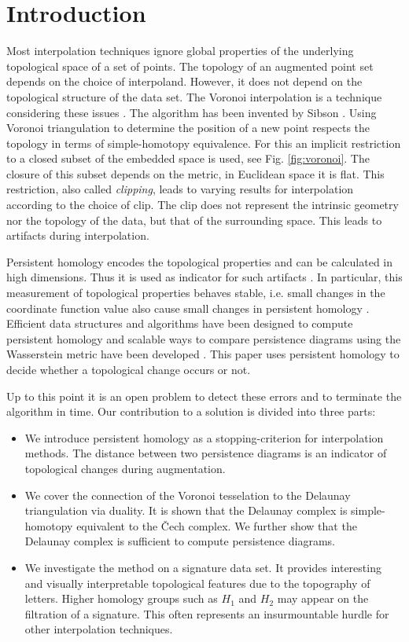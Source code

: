 \documentclass[runningheads]{llncs}
\begin{document}
\section{Introduction}
\label{introduction}
Most interpolation techniques ignore global properties of the underlying topological space of a set of points. The topology of an augmented point set depends on the choice of interpoland. However, it does not depend on the topological structure of the data set. The Voronoi interpolation is a technique considering these issues \cite{Bobach2009}. The algorithm has been invented by Sibson \cite{Sibson}. Using Voronoi triangulation to determine the position of a new point respects the topology in terms of simple-homotopy equivalence. For this an implicit restriction to a closed subset of the embedded space is used, see Fig. \ref{fig:voronoi}. The closure of this subset depends on the metric, in Euclidean space it is flat. This restriction, also called \textit{clipping}, leads to varying results for interpolation according to the choice of clip. The clip does not represent the intrinsic geometry nor the topology of the data, but that of the surrounding space. This leads to artifacts during interpolation.

Persistent homology encodes the topological properties and can be calculated in high dimensions. Thus it is used as indicator for such artifacts \cite{ZomorodianC05}. In particular, this measurement of topological properties behaves stable, i.e. small changes in the coordinate function value also cause small changes in persistent homology \cite{CerriL16}. Efficient data structures and algorithms have been designed to compute persistent homology \cite{ZomorodianC05,Zomorodian10} and scalable ways to compare persistence diagrams using the Wasserstein metric have been developed \cite{CarriereCO17}. This paper uses persistent homology to decide whether a topological change occurs or not.

Up to this point it is an open problem to detect these errors and to terminate the algorithm in time. Our contribution to a solution is divided into three parts:
\begin{itemize}
  \item We introduce persistent homology as a stopping-criterion for interpolation methods. The distance between two persistence diagrams is an indicator of topological changes during augmentation.
  \item We cover the connection of the Voronoi tesselation to the Delaunay triangulation via duality. It is shown that the Delaunay complex is simple-homotopy equivalent to the \v{C}ech complex. We further show that the Delaunay complex is sufficient to compute persistence diagrams.
  \item We investigate the method on a signature data set. It provides interesting and visually interpretable topological features due to the topography of letters. Higher homology groups such as $H_1$ and $H_2$ may appear on the filtration of a signature. This often represents an insurmountable hurdle for other interpolation techniques.
\end{itemize}
\end{document}
